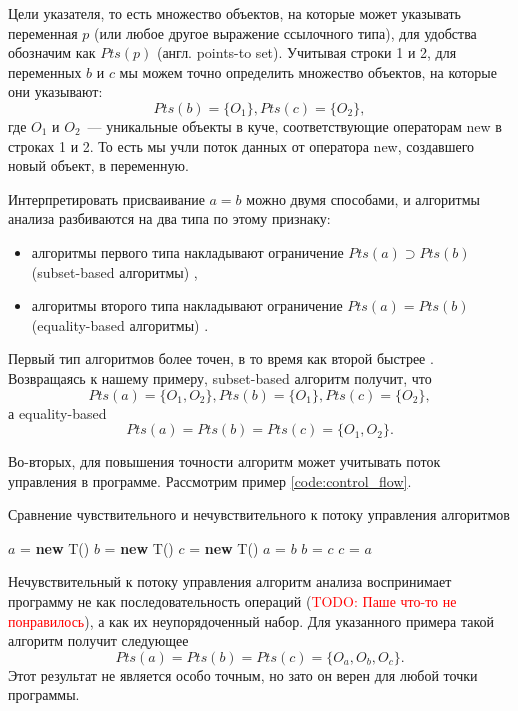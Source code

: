 \documentclass[14pt,titlepage]{extarticle}
\newcommand{\NEW}{\textbf{new }}
\newcommand{\todo}[1]{\textcolor{red}{\eng{TODO}: #1}}
\newcommand{\eng}[1]{{\English#1}}
\begin{document}
      Цели указателя, то есть множество объектов, на которые может указывать
      переменная $p$ (или любое другое выражение ссылочного типа), для удобства
      обозначим как $Pts(p)$ (англ. \eng{points-to set}).
      Учитывая строки 1 и 2, для переменных $b$ и $c$ мы можем точно определить
      множество объектов, на которые они указывают:
      \[Pts(b) = \{O_1\}, Pts(c) = \{O_2\},\] где $O_1$ и $O_2$~--- уникальные
      объекты в куче, соответствующие операторам \eng{new} в строках 1 и 2.
      То есть мы учли поток данных от оператора \eng{new}, создавшего новый
      объект, в переменную.

      Интерпретировать присваивание $a = b$ можно двумя способами,
      и алгоритмы анализа разбиваются на два типа по этому признаку:
      \begin{itemize}
        \item алгоритмы первого типа накладывают ограничение
              $Pts(a) \supset Pts(b)$ (\eng{subset-based} алгоритмы)
              \cite{rayside_overview},
        \item алгоритмы второго типа накладывают ограничение
              $Pts(a) = Pts(b)$ (\eng{equality-based} алгоритмы)
              \cite{rayside_overview}.
      \end{itemize}
      Первый тип алгоритмов более точен, в то время как второй быстрее
      \cite{steensgaard}. Возвращаясь к нашему примеру, \eng{subset-based}
      алгоритм получит, что
      \[Pts(a) = \{O_1, O_2\}, Pts(b) = \{O_1\}, Pts(c) = \{O_2\},\]
      а \eng{equality-based}
      \[Pts(a) = Pts(b) = Pts(c) = \{O_1, O_2\}.\]

      Во-вторых, для повышения точности алгоритм может учитывать поток
      управления в программе.
      Рассмотрим пример \ref{code:control_flow}.
      \begin{algorithm}
        \caption{Сравнение чувствительного и нечувствительного к потоку
                 управления алгоритмов}
        \label{code:control_flow}
        \begin{algorithmic}[1]
          \STATE $a$ = \NEW T()
          \STATE $b$ = \NEW T()
          \STATE $c$ = \NEW T()
          \STATE $a$ = $b$
          \STATE $b$ = $c$
          \STATE $c$ = $a$
        \end{algorithmic}
      \end{algorithm}

      Нечувствительный к потоку управления алгоритм анализа воспринимает
      программу не как последовательность операций (\todo{Паше что-то не
      понравилось}), а как их неупорядоченный набор.
      Для указанного примера такой алгоритм получит следующее
      \[Pts(a) = Pts(b) = Pts(c) = \{O_a, O_b, O_c\}.\]
      Этот результат не является особо точным, но зато он верен
      для любой точки программы.
\end{document}

